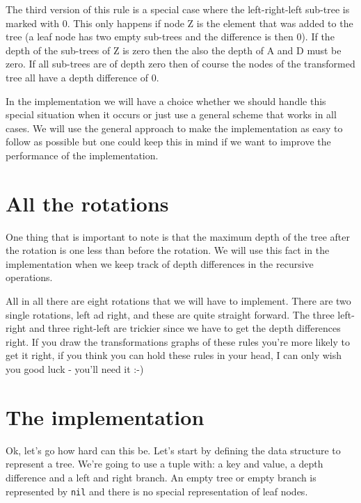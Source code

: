 \documentclass[a4paper,11pt]{article}
\begin{document}
The third version of this rule is a special case where the
left-right-left sub-tree is marked with 0. This only happens if node Z
is the element that was added to the tree (a leaf node has two empty
sub-trees and the difference is then 0). If the depth of the sub-trees
of Z is zero then the also the depth of A and D must be zero. If all
sub-trees are of depth zero then of course the nodes of the
transformed tree all have a depth difference of 0.

In the implementation we will have a choice whether we should handle
this special situation when it occurs or just use a general scheme
that works in all cases. We will use the general approach to make the
implementation as easy to follow as possible but one could keep this
in mind if we want to improve the performance of the implementation.



\section{All the rotations}

One thing that is important to note is that the maximum depth of the
tree after the rotation is one less than before the rotation. We will
use this fact in the implementation when we keep track of depth
differences in the recursive operations.

All in all there are eight rotations that we will have to
implement. There are two single rotations, left ad right, and these
are quite straight forward. The three left-right and three right-left
are trickier since we have to get the depth differences right. If you
draw the transformations graphs of these rules you're more likely to
get it right, if you think you can hold these rules in your head, I
can only wish you good luck - you'll need it :-)



\section{The implementation}

Ok, let's go how hard can this be. Let's start by defining the
data structure to represent a tree. We're going to use a tuple with: a
key and value, a depth difference and a left and right branch. An
empty tree or empty branch is represented by {\tt nil} and there is
no special representation of leaf nodes.
\end{document}
